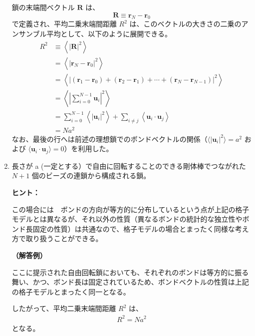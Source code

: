 \documentclass[uplatex,dvipdfmx,a4paper,11pt]{jsarticle}
\begin{document}
\begin{enumerate}
鎖の末端間ベクトル $\bm{R}$ は、
\begin{equation*}
\bm{R} \equiv \bm{r}_N - \bm{r}_0
\end{equation*}
で定義され、平均二乗末端間距離 $R^2$ は、このベクトルの大きさの二乗のアンサンブル平均として、以下のように展開できる。
\begin{align*}
R^2 
	&\equiv \left \langle \left | \bm{R} \right |^2 \right \rangle \\
	&= \left \langle \left | \bm{r}_N - \bm{r}_0 \right |^2 \right \rangle \\
	&= \left \langle \left | (\bm{r}_1 - \bm{r}_0) + (\bm{r}_2 - \bm{r}_1) + \cdots + (\bm{r}_N - \bm{r}_{N-1}) \right |^2 \right \rangle \\
	&= \left \langle \left| \sum_{i=0}^{N-1} \bm{u}_{i} \right|^2 \right\rangle \\
	&= \sum_{i=0}^{N-1} \left \langle \left| \bm{u}_{i} \right|^2 \right\rangle + \sum_{i \neq j} \left \langle \bm{u}_{i} \cdot \bm{u}_{j} \right\rangle \\
	&= N a^2
\end{align*}
なお、最後の行へは前述の理想鎖でのボンドベクトルの関係（$\langle \left| \bm{u}_{i} \right|^2 \rangle = a^2$ および $\langle \bm{u}_{i} \cdot \bm{u}_{j} \rangle = 0$）を利用した。

\newpage

\item 
長さが a  (一定とする）で自由に回転することのできる剛体棒でつながれた $N+1$ 個のビーズの連鎖から構成される鎖。

\begin{itembox}[l]{{\bf ヒント：}}

この場合には　ボンドの方向が等方的に分布しているという点が上記の格子モデルとは異なるが、それ以外の性質（異なるボンドの統計的な独立性やボンド長固定の性質）は共通なので、格子モデルの場合とまったく同様な考え方で取り扱うことができる。

\end{itembox}

{\bf （解答例）}

ここに提示された自由回転鎖においても、それぞれのボンドは等方的に振る舞い、かつ、ボンド長は固定されているため、ボンドベクトルの性質は上記の格子モデルとまったく同一となる。

したがって、平均二乗末端間距離 $R^2$ は、
\begin{align*}
R^2 
= N a^2
\end{align*}
となる。


\end{enumerate}
\end{document}
